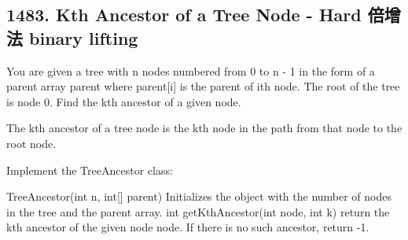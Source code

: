 \documentclass[9pt, b5paaper]{book}
\begin{document}
\subsection{1483. Kth Ancestor of a Tree Node - Hard 倍增法 binary lifting}
\label{sec-1-0-6}
You are given a tree with n nodes numbered from 0 to n - 1 in the form of a parent array parent where parent[i] is the parent of ith node. The root of the tree is node 0. Find the kth ancestor of a given node.

The kth ancestor of a tree node is the kth node in the path from that node to the root node.

Implement the TreeAncestor class:

TreeAncestor(int n, int[] parent) Initializes the object with the number of nodes in the tree and the parent array.
int getKthAncestor(int node, int k) return the kth ancestor of the given node node. If there is no such ancestor, return -1.
\end{document}
